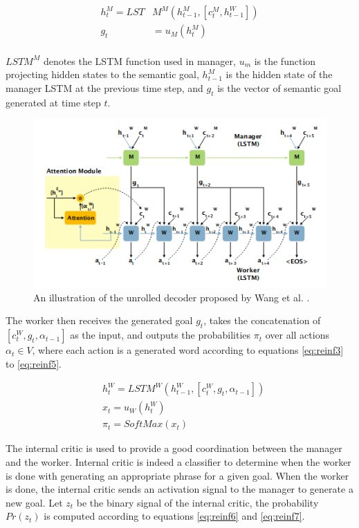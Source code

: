 \documentclass[preprint, 12pt]{elsarticle}
\begin{document}
		\begin{align}
			h_t^M = LST&M^M(h_{t-1}^M, [c_t^M, h_{t-1}^W]) \label{eq:reinf1} \\
			g_t &= u_M(h_t^M) \label{eq:reinf2}
		\end{align}
		\\
		$LSTM^M$ denotes the LSTM function used in manager, $u_m$ is the function projecting hidden states to the semantic goal, $h_{t-1}^M$ is the hidden state of the manager LSTM at the previous time step, and $g_t$ is the vector of semantic goal generated at time step $t$.
		
		\begin{figure}[h]
		\centering
		\includegraphics[scale=0.8]{Imgs/reinf2.png}
		\caption{An illustration of the unrolled decoder proposed by Wang et al. \cite{wang2018video}.}
		\label{fig:reinf2}
	\end{figure}
	
		The worker then receives the generated goal $g_t$, takes the concatenation of $[c_t^W, g_t, \alpha_{t-1}]$ as the input, and outputs the probabilities $\pi_t$ over all actions $\alpha_t \in V$, where each action is a generated word according to equations \eqref{eq:reinf3} to \eqref{eq:reinf5}.
		
		\begin{align}
			&h_t^W = LSTM^W(h_{t-1}^W, [c_t^W, g_t, \alpha_{t-1}]) \label{eq:reinf3} \\
			&x_t = u_W(h_t^W) \label{eq:reinf4} \\
			&\pi_t = SoftMax(x_t) \label{eq:reinf5} 
		\end{align}
		
		The internal critic is used to provide a good coordination between the manager and the worker. Internal critic is indeed a classifier to determine when the worker is done with generating an appropriate phrase for a given goal. When the worker is done, the internal critic sends an activation signal to the manager to generate a new goal. Let $z_t$ be the binary signal of the internal critic, the probability $Pr(z_t)$ is computed according to equations \eqref{eq:reinf6} and \eqref{eq:reinf7}.
		
\end{document}
